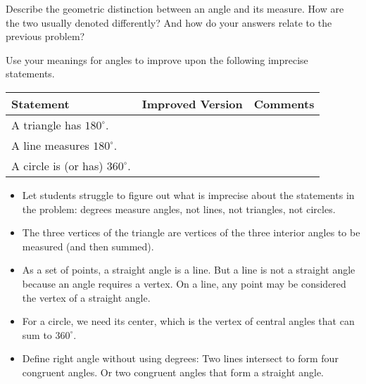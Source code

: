 \begin{prob}
Describe the geometric distinction between an angle and its measure.  How are the two usually denoted differently?  And how do your answers relate to the previous problem?  
\end{prob}
\vspace{.8in}

\begin{prob}
Use your meanings for angles to improve upon the following imprecise statements. 

\vspace{0.15in}

{\renewcommand{\arraystretch}{1.5}
\begin{tabular}{|>{\centering\arraybackslash}m{4cm}|>{\centering\arraybackslash}m{9.5cm}|>{\centering\arraybackslash}m{4cm}|}\hline
Statement & Improved Version & Comments \\\hline

\rule{0pt}{1cm}A triangle has $180^\circ$. & & \\ \hline

\rule{0pt}{1cm}A line measures $180^\circ$. & & \\ \hline

\rule{0pt}{1cm}A circle is (or has) $360^\circ$. & & \\ \hline
 \hline
\end{tabular}}
\end{prob}

\begin{teachingnote}
\begin{itemize}
\itemsep0em
\item Let students struggle to figure out what is imprecise about the statements in the problem:  degrees measure angles, not lines, not triangles, not circles. 
\item The three vertices of the triangle are vertices of the three interior angles to be measured (and then summed).  
\item As a set of points, a straight angle is a line.  But a line is not a straight angle because an angle requires a vertex.  On a line, any point may be considered the vertex of a straight angle.
\item For a circle, we need its center, which is the vertex of central angles 
that can sum to $360^\circ$.  
\item Define right angle without using degrees: Two lines intersect to form four congruent angles.  Or two congruent angles that form a straight angle.
\end{itemize}  
\end{teachingnote}



